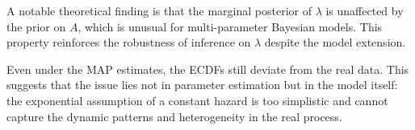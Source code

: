 A notable theoretical finding is that the marginal posterior of $\lambda$ is unaffected by the prior on $A$, which is unusual for multi-parameter Bayesian models. This property reinforces the robustness of inference on $\lambda$ despite the model extension.

Even under the MAP estimates, the ECDFs still deviate from the real data. This suggests that the issue lies not in parameter estimation but in the model itself: the exponential assumption of a constant hazard is too simplistic and cannot capture the dynamic patterns and heterogeneity in the real process.